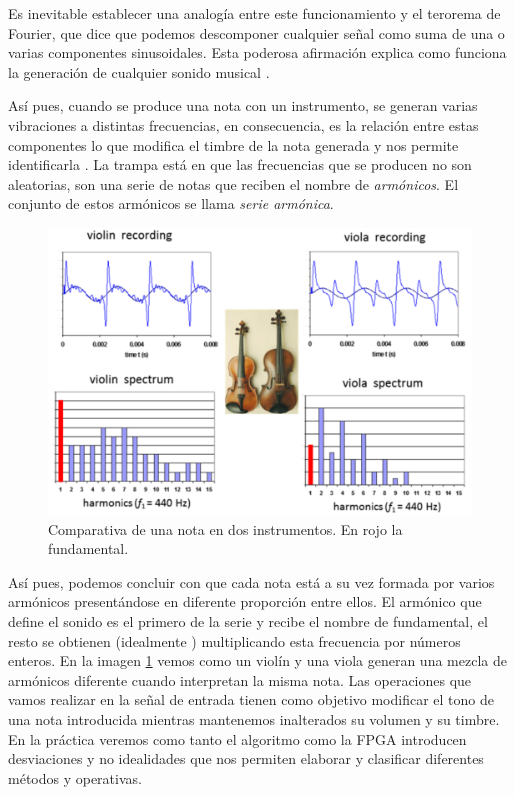 Es inevitable establecer una analogía entre este funcionamiento y el terorema de Fourier, que dice que podemos descomponer cualquier señal como suma de una o varias componentes sinusoidales. Esta poderosa afirmación explica como funciona la generación de cualquier sonido musical .

Así pues, cuando se produce una nota con un instrumento, se generan varias vibraciones a distintas frecuencias, en consecuencia, es la relación entre estas componentes lo que modifica el timbre de la nota generada y nos permite identificarla \cite{arm_str}. La trampa está en que las frecuencias que se producen no son aleatorias, son una serie de notas que reciben el nombre de \emph{armónicos}. El conjunto de estos armónicos se llama \emph{serie armónica}.

\begin{figure}[!b]
\begin{center}
\includegraphics[width=14cm]{img/armonicos.png}
\caption{\label{fig:armonicos}Comparativa de una nota en dos instrumentos. En rojo la fundamental.}
\end{center}
\end{figure}

Así pues, podemos concluir con que cada nota está a su vez formada por varios armónicos presentándose en diferente proporción entre ellos. El armónico que define el sonido es el primero de la serie y recibe el nombre de fundamental, el resto se obtienen (idealmente \cite{arm_wood2}) multiplicando esta frecuencia por números enteros. En la imagen \ref{fig:armonicos} vemos como un violín y una viola generan una mezcla de armónicos diferente cuando interpretan la misma nota. Las operaciones que vamos realizar en la señal de entrada tienen como objetivo modificar el tono de una nota introducida mientras mantenemos inalterados su volumen y su timbre. En la práctica veremos como tanto el algoritmo como la FPGA introducen desviaciones y no idealidades que nos permiten elaborar y clasificar diferentes métodos y operativas.

